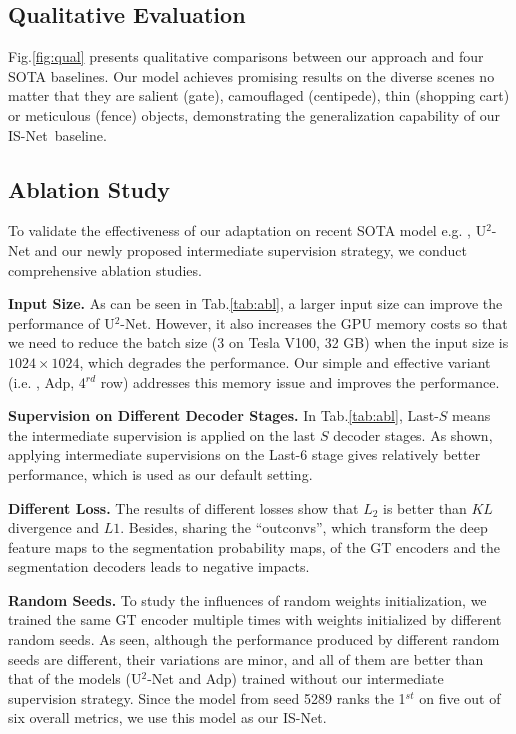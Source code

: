 \subsection{Qualitative Evaluation}

Fig.\ref{fig:qual} presents qualitative comparisons between our approach and four SOTA baselines. Our model achieves promising results on the diverse scenes no matter that they are salient (gate), camouflaged (centipede), thin (shopping cart) or meticulous (fence) objects, demonstrating the generalization capability of our IS-Net~baseline.

\subsection{Ablation Study}

To validate the effectiveness of our adaptation on recent SOTA model e.g. , U$^2$-Net and our newly proposed intermediate supervision strategy, we conduct comprehensive ablation studies. 

\textbf{Input Size.} As can be seen in Tab.\ref{tab:abl}, 
a larger input size can improve the performance of U$^2$-Net. However, it also increases the GPU memory costs so that we need to reduce the batch size (3 on Tesla V100, 32 GB) when the input size is $1024\times1024$, which degrades the performance. Our simple and effective variant (i.e. , Adp, 4$^{rd}$ row) addresses this memory issue and improves the performance.

\textbf{Supervision on Different Decoder Stages.} In Tab.\ref{tab:abl}, Last-$S$ means the intermediate supervision is applied on the last $S$ decoder stages. As shown, applying intermediate supervisions on the Last-6 stage gives relatively better performance, which is used as our default setting.

\textbf{Different Loss.} The results of different losses show that $L_2$ is better than $KL$ divergence and $L1$. Besides, sharing the ``outconvs'', which transform the deep feature maps to the segmentation probability maps, of the GT encoders and the segmentation decoders leads to negative impacts. 

\textbf{Random Seeds.} To study the influences of random weights initialization, we trained the same GT encoder multiple times with weights initialized by different random seeds. As seen, although the performance produced by different random seeds are different, their variations are minor, and all of them are better than that of the models (U$^2$-Net and Adp) trained without our intermediate supervision strategy. Since the model from seed 5289 ranks the 1$^{st}$ on five out of six overall metrics, we use this model as our IS-Net. 

